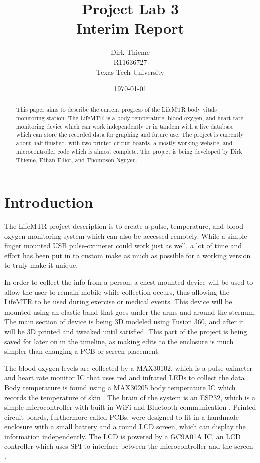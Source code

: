 \documentclass[12pt]{article}
\title{Project Lab 3\\\large Interim Report}
\author{Dirk Thieme\\R11636727\\Texas Tech University}
\date{\today}
\begin{document}
\maketitle %
\newpage
{} %

\begin{abstract}
    This paper aims to describe the current progress of the LifeMTR body vitals monitoring station. The LifeMTR is a body temperature, blood-oxygen, and heart rate monitoring device which can work independently or in tandem with a live database which can store the recorded data for graphing and future use. The project is currently about half finished, with two printed circuit boards, a mostly working website, and microcontroller code which is almost complete. The project is being developed by Dirk Thieme, Ethan Elliot, and Thompson Nguyen.
\end{abstract}

\newpage
\tableofcontents

\newpage
\listoffigures

\newpage
\section{Introduction}
    The LifeMTR project description is to create a pulse, temperature, and blood-oxygen monitoring system which can also be accessed remotely. While a simple finger mounted USB pulse-oximeter could work just as well, a lot of time and effort has been put in to custom make as much as possible for a working version to truly make it unique.
    
    In order to collect the info from a person, a chest mounted device will be used to allow the user to remain mobile while collection occurs, thus allowing the LifeMTR to be used during exercise or medical events. This device will be mounted using an elastic band that goes under the arms and around the sternum. The main section of device is being 3D modeled using Fusion 360, and after it will be 3D printed and tweaked until satisfied. This part of the project is being saved for later on in the timeline, as making edits to the enclosure is much simpler than changing a PCB or screen placement.
    
    The blood-oxygen levels are collected by a MAX30102, which is a pulse-oximeter and heart rate monitor IC that uses red and infrared LEDs to collect the data \cite{max30102}. Body temperature is found using a MAX30205 body temperature IC which records the temperature of skin \cite{max30205}. The brain of the system is an ESP32, which is a simple microcontroller with built in WiFi and Bluetooth communication \cite{esp32}. Printed circuit boards, furthermore called PCBs, were designed to fit in a handmade enclosure with a small battery and a round LCD screen, which can display the information independently. The LCD is powered by a GC9A01A IC, an LCD controller which uses SPI to interface between the microcontroller and the screen \cite{gc9a01a}.
    
\end{document}
